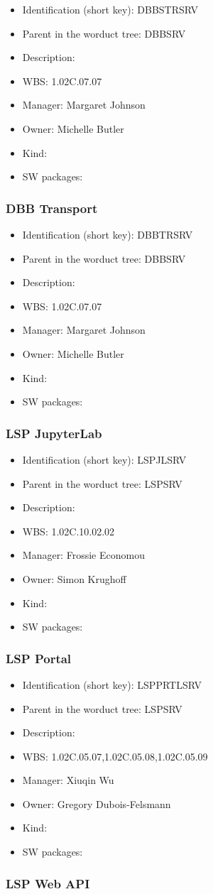 \begin{itemize}\item Identification (short key): DBBSTRSRV
\item Parent in the worduct tree: DBBSRV
\item Description: 
\item WBS: 1.02C.07.07
\item Manager: Margaret Johnson
\item Owner: Michelle Butler
\item Kind:
\item SW packages: 
\end{itemize}\subsubsection{DBB Transport}
\begin{itemize}\item Identification (short key): DBBTRSRV
\item Parent in the worduct tree: DBBSRV
\item Description: 
\item WBS: 1.02C.07.07
\item Manager: Margaret Johnson
\item Owner: Michelle Butler
\item Kind:
\item SW packages: 
\end{itemize}\subsubsection{LSP JupyterLab}
\begin{itemize}\item Identification (short key): LSPJLSRV
\item Parent in the worduct tree: LSPSRV
\item Description: 
\item WBS: 1.02C.10.02.02
\item Manager: Frossie Economou
\item Owner: Simon Krughoff
\item Kind:
\item SW packages: 
\end{itemize}\subsubsection{LSP Portal}
\begin{itemize}\item Identification (short key): LSPPRTLSRV
\item Parent in the worduct tree: LSPSRV
\item Description: 
\item WBS: 1.02C.05.07,1.02C.05.08,1.02C.05.09
\item Manager: Xiuqin Wu
\item Owner: Gregory Dubois-Felsmann
\item Kind:
\item SW packages: 
\end{itemize}\subsubsection{LSP Web API}

